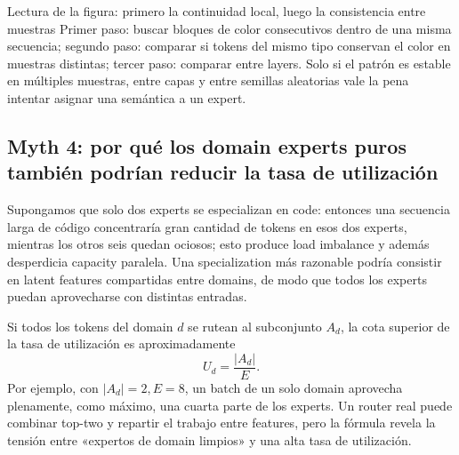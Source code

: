 
\begin{knowledgebox}{Lectura de la figura: primero la continuidad local, luego la consistencia entre muestras}
Primer paso: buscar bloques de color consecutivos dentro de una misma secuencia; segundo paso: comparar si tokens del mismo tipo conservan el color en muestras distintas; tercer paso: comparar entre layers. Solo si el patrón es estable en múltiples muestras, entre capas y entre semillas aleatorias vale la pena intentar asignar una semántica a un expert.
\end{knowledgebox}


\subsection{Myth 4: por qué los domain experts puros también podrían reducir la tasa de utilización}

Supongamos que solo dos experts se especializan en code: entonces una secuencia larga de código concentraría gran cantidad de tokens en esos dos experts, mientras los otros seis quedan ociosos; esto produce load imbalance y además desperdicia capacity paralela. Una specialization más razonable podría consistir en latent features compartidas entre domains, de modo que todos los experts puedan aprovecharse con distintas entradas.


Si todos los tokens del domain $d$ se rutean al subconjunto $A_d$, la cota superior de la tasa de utilización es aproximadamente
\[
U_d=\frac{|A_d|}{E}.
\]
Por ejemplo, con $|A_d|=2,E=8$, un batch de un solo domain aprovecha plenamente, como máximo, una cuarta parte de los experts. Un router real puede combinar top-two y repartir el trabajo entre features, pero la fórmula revela la tensión entre «expertos de domain limpios» y una alta tasa de utilización.


